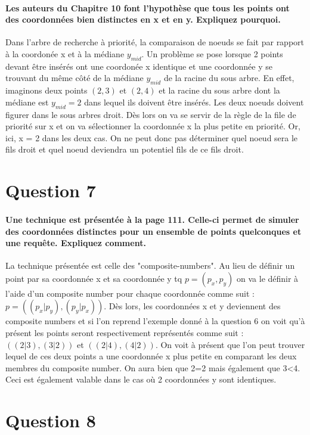 \documentclass{article}
\begin{document}
    \paragraph{Les auteurs du Chapitre 10 font l’hypothèse que tous les points ont des coordonnées bien
distinctes en x et en y. Expliquez pourquoi.}
Dans l'arbre de recherche à priorité, la comparaison de noeuds se fait par rapport à la coordonée x et à la médiane $y_{mid}$. Un problème se pose lorsque 2 points devant être insérés ont une coordonée x identique et une coordonnée y se trouvant du 
même côté de la médiane $y_{mid}$ de la racine du sous arbre. En effet, imaginons deux points $(2,3)$ et $(2,4)$ et la racine du sous arbre dont la médiane est $y_{mid} = 2$ dans lequel ils doivent être insérés. Les deux noeuds doivent figurer dans
le sous arbres droit. Dès lors on va se servir de la règle de la file de priorité sur x et on va sélectionner la coordonnée x la plus petite en priorité. Or, ici, x = 2 dans les deux cas. On ne peut donc pas déterminer quel noeud sera le fils droit 
et quel noeud deviendra un potentiel fils de ce fils droit.

\section{Question 7}
    \paragraph{Une technique est présentée à la page 111. Celle-ci permet de simuler des coordonnées
distinctes pour un ensemble de points quelconques et une requête. Expliquez comment.}
La technique présentée est celle des "composite-numbers". Au lieu de définir un point par sa coordonnée x et sa coordonnée y tq $p = (p_x , p_y)$ on va le définir à l'aide
d'un composite number pour chaque coordonnée comme suit : $p = ((p_x|p_y),(p_y|p_x))$.
Dès lors, les coordonnées x et y deviennent des composite numbers et si l'on reprend l'exemple donné à la question 6 on voit qu'à présent les points seront respectivement
représentés comme suit : $((2|3), (3|2))$ et $((2|4),(4|2))$. On voit à présent que l'on peut trouver lequel de ces deux points a une coordonnée x plus petite en comparant
les deux membres du composite number. On aura bien que 2=2 mais également que 3<4. Ceci est également valable dans le cas où 2 coordonnées y sont identiques.

\section{Question 8}
\end{document}
